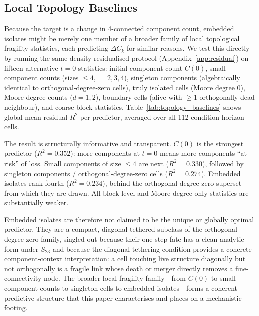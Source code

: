 \documentclass[aip,cha,preprint,nofootinbib]{revtex4-2}
\newcommand{\topCompCountR}{0.352}
\newcommand{\topSmallLeqFourR}{0.330}
\newcommand{\topSingletonR}{0.274}
\newcommand{\topIsoEmbeddedR}{0.234}
\newcommand{\Ck}{\Delta C_k}
\begin{document}
\subsection{Local Topology Baselines}
\label{sec:baselines}

Because the target is a change in 4-connected component count, embedded
isolates might be merely one member of a broader family of local topological
fragility statistics, each predicting $\Ck$ for similar reasons.
We test this directly by running the same density-residualised protocol
(Appendix~\ref{app:residual}) on fifteen alternative $t{=}0$ statistics:
initial component count $C(0)$, small-component counts (sizes $\leq 4$,
$=2,3,4$), singleton components (algebraically identical to orthogonal-degree-zero cells), truly isolated cells (Moore degree 0), Moore-degree counts
($d=1,2$), boundary cells (alive with $\geq 1$ orthogonally dead neighbour),
and coarse block statistics.
Table~\ref{tab:topology_baselines} shows global mean residual $R^2$ per
predictor, averaged over all 112 condition-horizon cells.

The result is structurally informative and transparent.
$C(0)$ is the strongest predictor ($R^2 = \topCompCountR$): more components
at $t{=}0$ means more components ``at risk'' of loss.
Small components of size $\leq 4$ are next ($R^2 = \topSmallLeqFourR$),
followed by singleton components / orthogonal-degree-zero cells
($R^2 = \topSingletonR$).
Embedded isolates rank fourth ($R^2 = \topIsoEmbeddedR$), behind
the orthogonal-degree-zero superset from which they are drawn.
All block-level and Moore-degree-only statistics are substantially weaker.

Embedded isolates are therefore not claimed to be the unique or globally
optimal predictor.
They are a compact, diagonal-tethered subclass of the orthogonal-degree-zero
family, singled out because their one-step fate has a clean analytic form
under $S_{23}$ and because the diagonal-tethering condition provides
a concrete component-context interpretation: a cell touching live structure
diagonally but not orthogonally is a fragile link whose death or merger
directly removes a fine-connectivity node.
The broader local-fragility family---from $C(0)$ to small-component counts
to singleton cells to embedded isolates---forms a coherent predictive
structure that this paper characterises and places on a mechanistic footing.
\end{document}
